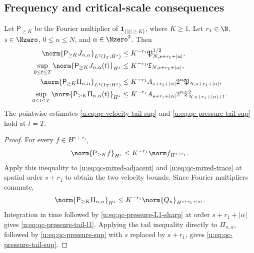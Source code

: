 \subsection{Frequency and critical-scale consequences}

\begin{proposition}
\label{u:prop:qc-frequency-tails}
Let \(\mathsf P_{\ge K}\) be the Fourier multiplier of
\(\mathbf 1_{\{|\xi|\ge K\}}\), where \(K\ge1\).  Let
\(r_1\in\N\), \(s\in\Nzero\), \(0\le n\le N\), and
\(\alpha\in\Nzero^3\).  Then
\begin{align}
 \norm{\mathsf P_{\ge K}J_{n,\alpha}}_{L^2(I_T;H^s)}
 &\le K^{-r_1}\mathfrak P_{N,s+r_1+|\alpha|}^{1/2},
 \label{u:eq:qc-velocity-tail-l2}\\
 \sup_{0\le t\le T}
 \norm{\mathsf P_{\ge K}J_{n,\alpha}(t)}_{H^s}
 &\le K^{-r_1}\mathfrak T_{N,s+r_1+|\alpha|},
 \label{u:eq:qc-velocity-tail-sup}\\
 \norm{\mathsf P_{\ge K}\Pi_{n,\alpha}}_{L^1(I_T;H^s)}
 &\le K^{-r_1}A_{s+r_1+|\alpha|}2^n
 \mathfrak P_{N,s+r_1+|\alpha|},
 \label{u:eq:qc-pressure-tail-l1}\\
 \sup_{0\le t\le T}
 \norm{\mathsf P_{\ge K}\Pi_{n,\alpha}(t)}_{H^s}
 &\le K^{-r_1}A_{s+r_1+|\alpha|}2^n
 \mathfrak T_{N,s+r_1+|\alpha|+1}^2.
 \label{u:eq:qc-pressure-tail-sup}
\end{align}
The pointwise estimates \eqref{u:eq:qc-velocity-tail-sup} and
\eqref{u:eq:qc-pressure-tail-sup} hold at \(t=T\).
\end{proposition}

\begin{proof}
For every \(f\in H^{s+r_1}\),
\[
 \norm{\mathsf P_{\ge K}f}_{H^s}
 \le K^{-r_1}\norm f_{H^{s+r_1}}.
\]
Apply this inequality to
\eqref{u:eq:qc-mixed-adjacent} and \eqref{u:eq:qc-mixed-trace} at spatial order
\(s+r_1\) to obtain the two velocity bounds.  Since Fourier multipliers
commute,
\[
 \norm{\mathsf P_{\ge K}\Pi_{n,\alpha}}_{H^s}
 \le K^{-r_1}\norm{Q_n}_{H^{s+r_1+|\alpha|}}.
\]
Integration in time followed by
\eqref{u:eq:qc-pressure-L1-sharp} at order \(s+r_1+|\alpha|\) gives
\eqref{u:eq:qc-pressure-tail-l1}.  Applying the tail inequality directly to
\(\Pi_{n,\alpha}\), followed by \eqref{u:eq:qc-pressure-sup} with \(s\) replaced
by \(s+r_1\), gives \eqref{u:eq:qc-pressure-tail-sup}.
\end{proof}

